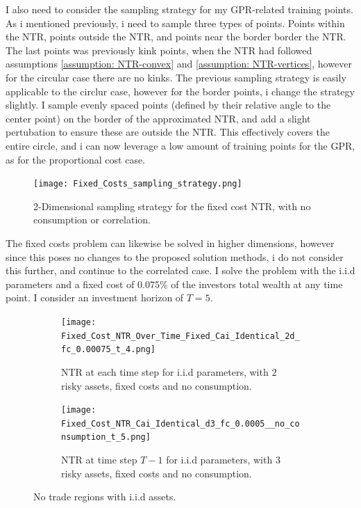 \documentclass[11pt]{article}
\begin{document}
I also need to consider the sampling strategy for my \ac{GPR}-related training points. As i mentioned previously, i need to sample three types of points.
Points within the \ac{NTR}, points outside the \ac{NTR}, and points near the border border the \ac{NTR}. The last points was previously kink points,
when the NTR had followed assumptions \ref{assumption: NTR-convex} and \ref{assumption: NTR-vertices}, however for the circular case there are no kinks.
The previous sampling strategy is easily applicable to the circlur case, however for the border points, i change the strategy slightly.
I sample evenly spaced points (defined by their relative angle to the center point) on the border of the approximated \ac{NTR}, and add a slight pertubation to ensure these are outside the NTR.
This effectively covers the entire circle, and i can now leverage a low amount of training points for the GPR, as for the proportional cost case.
\begin{figure}[!ht]
    \centering
    \texttt{[image: Fixed\_Costs\_sampling\_strategy.png]}
    \caption{2-Dimensional sampling strategy for the fixed cost NTR, with no consumption or correlation.}
    \label{fig:Sample_Strategy_Fixed}
\end{figure}
The fixed costs problem can likewise be solved in higher dimensions, however since this poses no changes to the proposed solution methods,
i do not consider this further, and continue to the correlated case.
I solve the problem with the i.i.d parameters and a fixed cost of $0.075\%$ of the investors total wealth at any time point. I consider an investment horizon of $T = 5$.
\begin{figure}[!ht]
    \centering
    \begin{subfigure}[t]{0.48\textwidth}
        \centering
        \texttt{[image: Fixed\_Cost\_NTR\_Over\_Time\_Fixed\_Cai\_Identical\_2d\_fc\_0.00075\_t\_4.png]}
        \caption{NTR at each time step for i.i.d parameters, with $2$ risky assets, fixed costs and no consumption.}
        \label{fig:Fixed_NTR_2d_iid_over_time}
    
    \end{subfigure}%
    \hfill
    \begin{subfigure}[t]{0.48\textwidth}
        \centering
        \texttt{[image: Fixed\_Cost\_NTR\_Cai\_Identical\_d3\_fc\_0.0005\_\_no\_consumption\_t\_5.png]}
        \caption{NTR at time step $T-1$ for i.i.d parameters, with $3$ risky assets, fixed costs and no consumption.}
        \label{fig:NTR_3d_iid_T-1}
    \end{subfigure}
    \caption{No trade regions with i.i.d assets.}
\end{figure}
\end{document}
